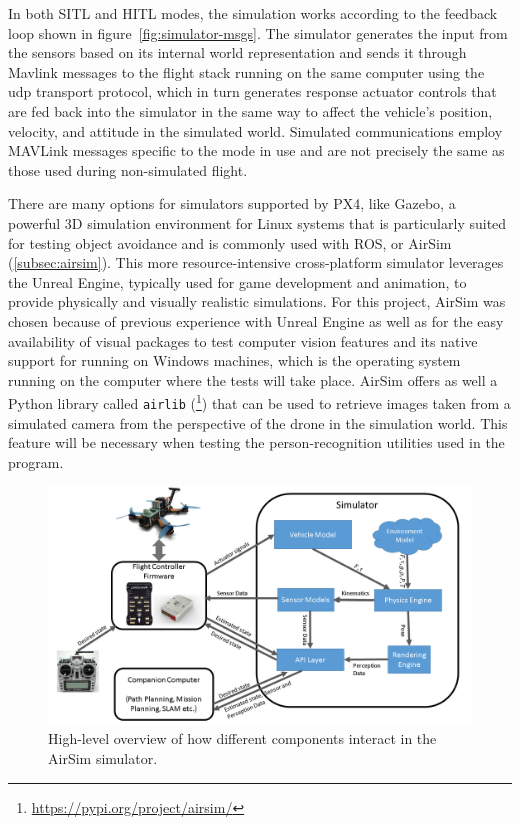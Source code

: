 In both SITL and HITL modes, the simulation works according to the feedback loop shown in figure~\ref{fig:simulator-msgs}. 
The simulator generates the input from the sensors based on its internal world representation and sends it through Mavlink messages to the flight stack running on the same computer using the \gls{udp} transport protocol,
which in turn generates response actuator controls that are fed back into the simulator in the same way to affect the vehicle's position, velocity, and attitude in the simulated world.
Simulated communications employ MAVLink messages specific to the mode in use and are not precisely the same as those used during non-simulated flight.

There are many options for simulators supported by PX4, like Gazebo, a powerful 3D simulation environment for Linux systems that is particularly suited for testing object avoidance and is commonly used with ROS, or AirSim (\ref{subsec:airsim}). This more resource-intensive cross-platform simulator leverages the Unreal Engine, typically used for game development and animation, to provide physically and visually realistic simulations.
For this project, AirSim was chosen because of previous experience with Unreal Engine as well as for the easy availability of visual packages to test computer vision features and its native support for running on Windows machines, which is the operating system running on the computer where the tests will take place.
AirSim offers as well a Python library called \texttt{airlib} (\footnote{\url{https://pypi.org/project/airsim/}}) that can be used to retrieve images taken from a simulated camera from the perspective of the drone in the simulation world.
This feature will be necessary when testing the person-recognition utilities used in the program.

\begin{figure}
  \centering
  \includegraphics[width=\textwidth,keepaspectratio]{img/airsim-overview.png}
  \caption{High-level overview of how different components interact in the AirSim simulator.}
  \label{fig:airsim-overview}
\end{figure}

